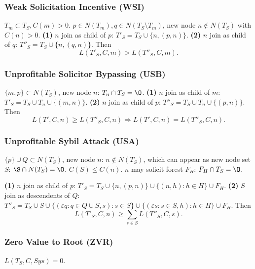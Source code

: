 \documentclass[a4paper,twocolumn,10pt]{article}
\begin{document}
	\subsubsection{Weak Solicitation Incentive (WSI)}
		$T_m\subset T_S, C(m)>0$.
		$p\in N(T_m), q\in N(T_S\setminus T_m)$,
			new node $n\notin N(T_S)$ with $C(n)>0$.
		\textbf{(1)} $n$ join as child of $p$: $T'_S=T_S\cup\{n,(p,n)\}$.
		\textbf{(2)} $n$ join as child of $q$: $T''_S=T_S\cup\{n,(q,n)\}$.
		Then
		\[
			L(T'_S,C,m) > L(T''_S,C,m).
		\]
	\subsubsection{Unprofitable Solicitor Bypassing (USB)}
		$\{m,p\}\subset N(T_S)$,
		new node $n$: $T_n\cap T_S = \O$.
		\textbf{(1)} $n$ join as child of $m$: $T'_S=T_S\cup T_n\cup\{(m,n)\}$.
		\textbf{(2)} $n$ join as child of $p$: $T''_S=T_S\cup T_n\cup\{(p,n)\}$.
		Then
		\[
			L(T',C,n) \ge L(T''_S,C,n)
			\Longrightarrow
			L(T',C,n) = L(T''_S,C,n).
		\]
	\subsubsection{Unprofitable Sybil Attack (USA)}
		$\{p\}\cup Q \subset N(T_S)$,
		new node $n$: $n\notin N(T_S)$,
		which can appear as new node set $S$: $\S\cap N(T_S)=\O$.
		$C(S)\le C(n)$.
		$n$ may solicit forest $F_H$: $F_H\cap T_S=\O$.

		\textbf{(1)} $n$ join as child of $p$:
			$T'_S=T_S\cup\{n,(p,n)\}\cup\{(n,h):h\in H\}\cup F_H$.
		\textbf{(2)} $S$ join as descendents of $Q$:
			$T''_S=T_S\cup S\cup\{(\varepsilon q:q\in Q\cup S, s): s\in S\}
			\cup \{(\varepsilon s:s\in S,h): h\in H\} \cup F_H$.
		Then
		\[
			L(T'_S,C,n) \ge \sum_{s\in S} L(T''_S,C,s).
		\]
	\subsubsection{Zero Value to Root (ZVR)}
		$L(T_S,C,Sys)=0$.
		
\end{document}

